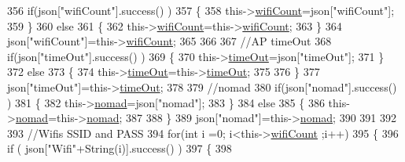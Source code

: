 \begin{DoxyCode}
356             \textcolor{keywordflow}{if}(json[\textcolor{stringliteral}{"wifiCount"}].success() )
357             \{           
358                 this->\hyperlink{class_cool_wifi_ab133bd92fcb895b884deecd6678592e4}{wifiCount}=json[\textcolor{stringliteral}{"wifiCount"}];
359             \}
360             \textcolor{keywordflow}{else}
361             \{
362                 this->\hyperlink{class_cool_wifi_ab133bd92fcb895b884deecd6678592e4}{wifiCount}=this->\hyperlink{class_cool_wifi_ab133bd92fcb895b884deecd6678592e4}{wifiCount};
363             \}
364             json[\textcolor{stringliteral}{"wifiCount"}]=this->\hyperlink{class_cool_wifi_ab133bd92fcb895b884deecd6678592e4}{wifiCount};
365 
366             
367             \textcolor{comment}{//AP timeOut}
368             \textcolor{keywordflow}{if}(json[\textcolor{stringliteral}{"timeOut"}].success() )
369             \{
370                 this->\hyperlink{class_cool_wifi_a952111605f25156588b5632caaba1c6f}{timeOut}=json[\textcolor{stringliteral}{"timeOut"}];
371             \}
372             \textcolor{keywordflow}{else}
373             \{
374                 this->\hyperlink{class_cool_wifi_a952111605f25156588b5632caaba1c6f}{timeOut}=this->\hyperlink{class_cool_wifi_a952111605f25156588b5632caaba1c6f}{timeOut};
375 
376             \}
377             json[\textcolor{stringliteral}{"timeOut"}]=this->\hyperlink{class_cool_wifi_a952111605f25156588b5632caaba1c6f}{timeOut};
378 
379             \textcolor{comment}{//nomad}
380             \textcolor{keywordflow}{if}(json[\textcolor{stringliteral}{"nomad"}].success() )
381             \{
382                 this->\hyperlink{class_cool_wifi_ab7d9643c4af7bac3be331ef008b2ea27}{nomad}=json[\textcolor{stringliteral}{"nomad"}];
383             \}
384             \textcolor{keywordflow}{else}
385             \{
386                 this->\hyperlink{class_cool_wifi_ab7d9643c4af7bac3be331ef008b2ea27}{nomad}=this->\hyperlink{class_cool_wifi_ab7d9643c4af7bac3be331ef008b2ea27}{nomad};
387 
388             \}
389             json[\textcolor{stringliteral}{"nomad"}]=this->\hyperlink{class_cool_wifi_ab7d9643c4af7bac3be331ef008b2ea27}{nomad};
390 
391             
392             
393             \textcolor{comment}{//Wifis SSID and PASS}
394             \textcolor{keywordflow}{for}(\textcolor{keywordtype}{int} i =0; i<this->\hyperlink{class_cool_wifi_ab133bd92fcb895b884deecd6678592e4}{wifiCount} ;i++)
395             \{
396                 \textcolor{keywordflow}{if} ( json[\textcolor{stringliteral}{"Wifi"}+String(i)].success() )
397                 \{
398                     

\end{DoxyCode}
